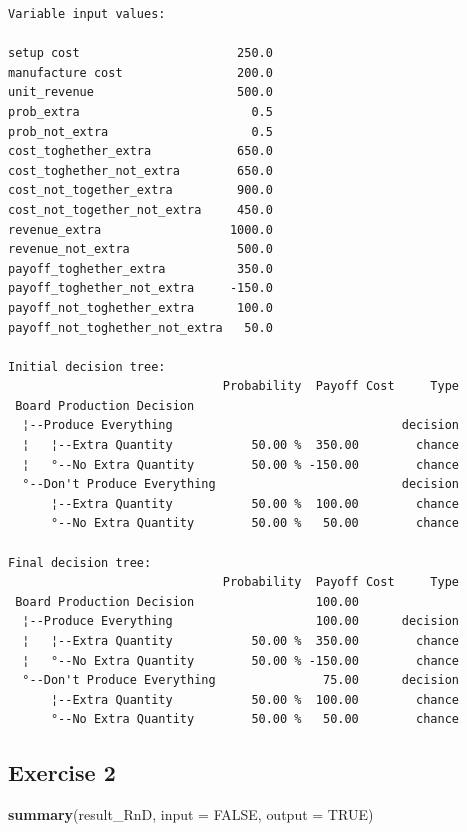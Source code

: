 \documentclass[]{article}
\newenvironment{Shaded}{\begin{snugshade}}{\end{snugshade}}
\newcommand{\KeywordTok}[1]{\textcolor[rgb]{0.13,0.29,0.53}{\textbf{#1}}}
\newcommand{\DataTypeTok}[1]{\textcolor[rgb]{0.13,0.29,0.53}{#1}}
\newcommand{\OtherTok}[1]{\textcolor[rgb]{0.56,0.35,0.01}{#1}}
\newcommand{\NormalTok}[1]{#1}
\begin{document}
\begin{verbatim}
Variable input values:
                                     
setup cost                      250.0
manufacture cost                200.0
unit_revenue                    500.0
prob_extra                        0.5
prob_not_extra                    0.5
cost_toghether_extra            650.0
cost_toghether_not_extra        650.0
cost_not_together_extra         900.0
cost_not_together_not_extra     450.0
revenue_extra                  1000.0
revenue_not_extra               500.0
payoff_toghether_extra          350.0
payoff_toghether_not_extra     -150.0
payoff_not_toghether_extra      100.0
payoff_not_toghether_not_extra   50.0

Initial decision tree:
                              Probability  Payoff Cost     Type
 Board Production Decision                                     
  ¦--Produce Everything                                decision
  ¦   ¦--Extra Quantity           50.00 %  350.00        chance
  ¦   °--No Extra Quantity        50.00 % -150.00        chance
  °--Don't Produce Everything                          decision
      ¦--Extra Quantity           50.00 %  100.00        chance
      °--No Extra Quantity        50.00 %   50.00        chance

Final decision tree:
                              Probability  Payoff Cost     Type
 Board Production Decision                 100.00              
  ¦--Produce Everything                    100.00      decision
  ¦   ¦--Extra Quantity           50.00 %  350.00        chance
  ¦   °--No Extra Quantity        50.00 % -150.00        chance
  °--Don't Produce Everything               75.00      decision
      ¦--Extra Quantity           50.00 %  100.00        chance
      °--No Extra Quantity        50.00 %   50.00        chance
\end{verbatim}

\subsection{Exercise 2}\label{exercise-2}

\begin{Shaded}
\begin{Highlighting}[]
\KeywordTok{summary}\NormalTok{(result_RnD, }\DataTypeTok{input =} \OtherTok{FALSE}\NormalTok{, }\DataTypeTok{output =} \OtherTok{TRUE}\NormalTok{)}
\end{Highlighting}
\end{Shaded}
\end{document}
